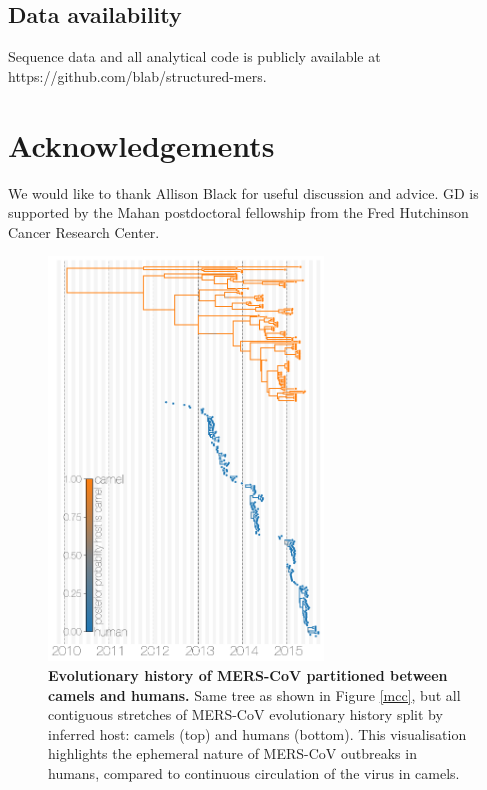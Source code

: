 \documentclass[11pt,oneside,letterpaper]{article}
\begin{document}
\subsection*{Data availability}
Sequence data and all analytical code is publicly available at https://github.com/blab/structured-mers.

\section*{Acknowledgements}
We would like to thank Allison Black for useful discussion and advice.
GD is supported by the Mahan postdoctoral fellowship from the Fred Hutchinson Cancer Research Center.





\setcounter{figure}{0}
\setcounter{table}{0}
\renewcommand{\thefigure}{S\arabic{figure}}
\renewcommand{\thetable}{S\arabic{table}}

\begin{figure}[h]
\centering
	\includegraphics[width=0.65\textwidth]{figures/mers_exploded.png}
	\caption{\textbf{Evolutionary history of MERS-CoV partitioned between camels and humans.}
Same tree as shown in Figure \ref{mcc}, but all contiguous stretches of MERS-CoV evolutionary history split by inferred host: camels (top) and humans (bottom).
This visualisation highlights the ephemeral nature of MERS-CoV outbreaks in humans, compared to continuous circulation of the virus in camels.
	}
	\label{exploded}
\end{figure}
\end{document}
